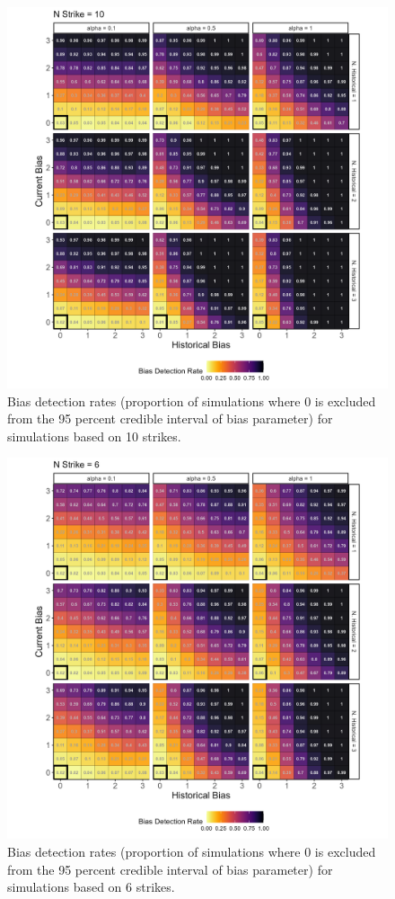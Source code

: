 \documentclass[12pt]{article}
\begin{document}
\begin{figure}

{\centering \includegraphics[width=0.95\linewidth]{../figures/pp10_95CI} 

}

\caption{Bias detection rates (proportion of simulations where 0 is excluded from the 95 percent credible interval of bias parameter) for simulations based on 10 strikes.}\label{fig:figbd9510}
\end{figure}

\begin{figure}

{\centering \includegraphics[width=0.95\linewidth]{../figures/pp6_95CI} 

}

\caption{Bias detection rates (proportion of simulations where 0 is excluded from the 95 percent credible interval of bias parameter) for simulations based on 6 strikes.}\label{fig:figbd956}
\end{figure}
\end{document}
